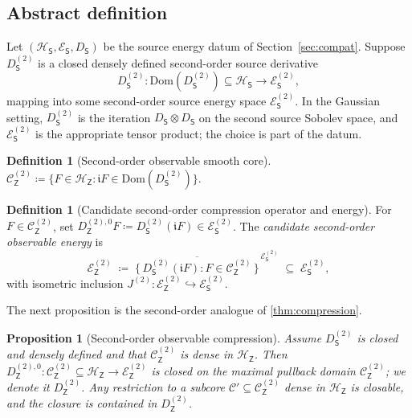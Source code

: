 \documentclass[11pt,reqno]{amsart}
\theoremstyle{plain}
\newtheorem{proposition}[theorem]{Proposition}
\theoremstyle{definition}
\newtheorem{definition}[theorem]{Definition}
\theoremstyle{remark}
\newcommand{\Hilb}{\mathcal{H}}
\newcommand{\Dom}{\mathrm{Dom}}
\newcommand{\Energy}{\mathcal{E}}
\newcommand{\Source}{\mathsf{S}}
\newcommand{\Obs}{\mathsf{Z}}
\renewcommand{\iota}{\mathfrak{i}}
\begin{document}
\subsection*{Abstract definition}

Let $(\Hilb_\Source,\Energy_\Source,D_\Source)$ be the source energy
datum of Section~\ref{sec:compat}. Suppose $D_\Source^{(2)}$ is a closed
densely defined second-order source derivative
\[
  D_\Source^{(2)}\colon\Dom(D_\Source^{(2)})\subseteq\Hilb_\Source
   \longrightarrow\Energy_\Source^{(2)},
\]
mapping into some second-order source energy space
$\Energy_\Source^{(2)}$. In the Gaussian setting, $D_\Source^{(2)}$ is
the iteration $D_\Source\otimes D_\Source$ on the second source
Sobolev space, and $\Energy_\Source^{(2)}$ is the appropriate tensor
product; the choice is part of the datum.

\begin{definition}[Second-order observable smooth core]
\label{def:obs-core-2}
$\mathcal C_\Obs^{(2)}\coloneqq
 \bigl\{F\in\Hilb_\Obs:\iota F\in\Dom(D_\Source^{(2)})\bigr\}$.
\end{definition}

\begin{definition}[Candidate second-order compression operator and energy]
\label{def:compression-2}
For $F\in\mathcal C_\Obs^{(2)}$, set
$D_\Obs^{(2),0}F\coloneqq D_\Source^{(2)}(\iota F)
\in\Energy_\Source^{(2)}$.
The \emph{candidate second-order observable energy} is
\[
  \Energy_\Obs^{(2)}
  \;\coloneqq\;
  \overline{\bigl\{\,D_\Source^{(2)}(\iota F):F\in\mathcal C_\Obs^{(2)}\,\bigr\}}
   ^{\,\Energy_\Source^{(2)}}
  \;\subseteq\;\Energy_\Source^{(2)},
\]
with isometric inclusion
$J^{(2)}\colon\Energy_\Obs^{(2)}\hookrightarrow\Energy_\Source^{(2)}$.
\end{definition}

The next proposition is the second-order analogue of
\cref{thm:compression}.

\begin{proposition}[Second-order observable compression]
\label{prop:compression-2}
Assume $D_\Source^{(2)}$ is closed and densely defined and that
$\mathcal C_\Obs^{(2)}$ is dense in $\Hilb_\Obs$. Then
$D_\Obs^{(2),0}\colon\mathcal C_\Obs^{(2)}\subseteq\Hilb_\Obs
\to\Energy_\Obs^{(2)}$ is closed on the maximal pullback domain
$\mathcal C_\Obs^{(2)}$; we denote it $D_\Obs^{(2)}$. Any restriction
to a subcore $\mathcal C'\subseteq\mathcal C_\Obs^{(2)}$ dense in
$\Hilb_\Obs$ is closable, and the closure is contained in
$D_\Obs^{(2)}$.
\end{proposition}
\end{document}
